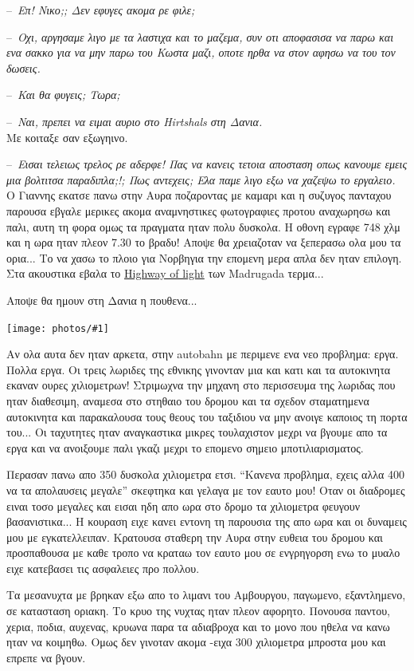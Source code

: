 \documentclass[11pt, letterpaper]{book}
\newcommand\dialogue[1]{\par\noindent--~\textit{#1}}
\newcommand\photo[1]{\begin{center}\noindent\texttt{[image: photos/\#1]}\end{center}}
\begin{document}
\dialogue{Επ! Νικο;; Δεν εφυγες ακομα ρε φιλε;}
\dialogue{Οχι, αργησαμε λιγο με τα λαστιχα και το μαζεμα, συν οτι αποφασισα να παρω και ενα σακκο για να μην παρω του Κωστα μαζι, οποτε ηρθα να στον αφησω να του τον δωσεις.}
\dialogue{Και θα φυγεις; Τωρα;}
\dialogue{Ναι, πρεπει να ειμαι αυριο στο Hirtshals στη Δανια.}\\

\noindent Με κοιταξε σαν εξωγηινο.\\

\dialogue{Εισαι τελειως τρελος ρε αδερφε! Πας να κανεις τετοια αποσταση οπως κανουμε εμεις μια βολτιτσα παραδιπλα;!; Πως αντεχεις; Ελα παμε λιγο εξω να χαζεψω το εργαλειο.}\\

Ο Γιαννης εκατσε πανω στην Αυρα ποζαροντας με καμαρι και η συζυγος πανταχου παρουσα εβγαλε μερικες ακομα αναμνηστικες φωτογραφιες προτου αναχωρησω και παλι, αυτη τη φορα ομως τα πραγματα ηταν πολυ δυσκολα. Η οθονη εγραφε 748 χλμ και η ωρα ηταν πλεον 7.30 το βραδυ! Αποψε θα χρειαζοταν να ξεπερασω ολα μου τα ορια... Το να χασω το πλοιο για Νορβηγια την επομενη μερα απλα δεν ηταν επιλογη. 
Στα ακουστικα εβαλα το \href{http://www.youtube.com/watch?v=g5vYEAUIcLM}{Highway of light} των Madrugada τερμα...

Αποψε θα ημουν στη Δανια η πουθενα...

\photo{131.jpg}

Αν ολα αυτα δεν ηταν αρκετα, στην autobahn με περιμενε ενα νεο προβλημα: εργα. Πολλα εργα. Οι τρεις λωριδες της εθνικης γινονταν μια και κατι και τα αυτοκινητα εκαναν ουρες χιλιομετρων! Στριμωχνα την μηχανη στο περισσευμα της λωριδας που ηταν διαθεσιμη, αναμεσα στο στηθαιο του δρομου και τα σχεδον σταματημενα αυτοκινητα και παρακαλουσα τους θεους του ταξιδιου να μην ανοιγε καποιος τη πορτα του... Οι ταχυτητες ηταν αναγκαστικα μικρες τουλαχιστον μεχρι να βγουμε απο τα εργα και να ανοιξουμε παλι γκαζι μεχρι το επομενο σημειο μποτιλιαρισματος.

Περασαν πανω απο 350 δυσκολα χιλιομετρα ετσι. ``Κανενα προβλημα, εχεις αλλα 400 να τα απολαυσεις μεγαλε'' σκεφτηκα και γελαγα με τον εαυτο μου!
Οταν οι διαδρομες ειναι τοσο μεγαλες και εισαι ηδη απο ωρα στο δρομο τα χιλιομετρα φευγουν βασανιστικα...
Η κουραση ειχε κανει εντονη τη παρουσια της απο ωρα και οι δυναμεις μου με εγκατελλειπαν. Κρατουσα σταθερη την Αυρα στην ευθεια του δρομου και προσπαθουσα με καθε τροπο να κραταω τον εαυτο μου σε ενγρηγορση ενω το μυαλο ειχε κατεβασει τις ασφαλειες προ πολλου.

Τα μεσανυχτα με βρηκαν εξω απο το λιμανι του Αμβουργου, παγωμενο, εξαντλημενο, σε κατασταση οριακη. Το κρυο της νυχτας ηταν πλεον αφορητο. Πονουσα παντου, χερια, ποδια, αυχενας, κρυωνα παρα τα αδιαβροχα και το μονο που ηθελα να κανω ηταν να κοιμηθω. Ομως δεν γινοταν ακομα -ειχα 300 χιλιομετρα μπροστα μου και επρεπε να βγουν.
\end{document}
